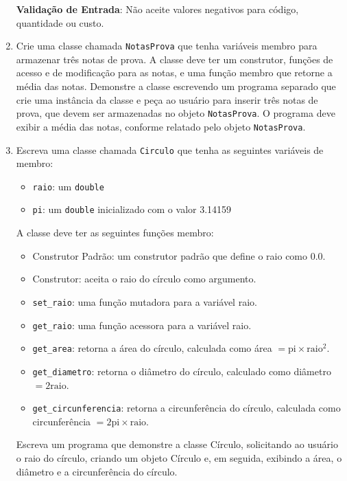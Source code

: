 \documentclass[12pt]{article}
\begin{document}
\begin{enumerate}
    \textbf{Validação de Entrada}: Não aceite valores negativos para código, quantidade ou custo.

  \item Crie uma classe chamada \texttt{NotasProva} que tenha variáveis membro para armazenar três notas de prova. A classe deve ter um construtor, funções de acesso e de modificação para as notas, e uma função membro que retorne a média das notas. Demonstre a classe escrevendo um programa separado que crie uma instância da classe e peça ao usuário para inserir três notas de prova, que devem ser armazenadas no objeto \texttt{NotasProva}. O programa deve exibir a média das notas, conforme relatado pelo objeto \texttt{NotasProva}.

  \item Escreva uma classe chamada \texttt{Circulo} que tenha as seguintes variáveis de membro:
    \begin{itemize}
      \item \texttt{raio}: um \texttt{double}
      \item \texttt{pi}: um \texttt{double} inicializado com o valor 3.14159
    \end{itemize}
    A classe deve ter as seguintes funções membro:
    \begin{itemize}
      \item Construtor Padrão: um construtor padrão que define o raio como 0.0.
      \item Construtor: aceita o raio do círculo como argumento.
      \item \texttt{set\_raio}: uma função mutadora para a variável raio.
      \item \texttt{get\_raio}: uma função acessora para a variável raio.
      \item \texttt{get\_area}: retorna a área do círculo, calculada como área $= \text{pi} \times \text{raio}^2$.
      \item \texttt{get\_diametro}: retorna o diâmetro do círculo, calculado como diâmetro $= 2\text{raio}$.
      \item \texttt{get\_circunferencia}: retorna a circunferência do círculo, calculada como circunferência $= 2\text{pi} \times \text{raio}$.
    \end{itemize}
    Escreva um programa que demonstre a classe Círculo, solicitando ao usuário o raio do círculo, criando um objeto Círculo e, em seguida, exibindo a área, o diâmetro e a circunferência do círculo.


\end{enumerate}
\end{document}
